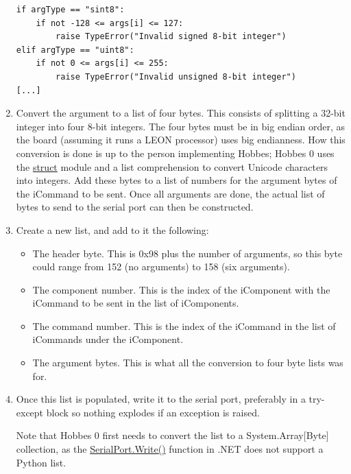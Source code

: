 \documentclass[12pt,letterpaper]{article}
\begin{document}
\begin{enumerate}
\selectfont

\begin{lstlisting}
if argType == "sint8":
    if not -128 <= args[i] <= 127:
        raise TypeError("Invalid signed 8-bit integer")
elif argType == "uint8":
    if not 0 <= args[i] <= 255:
        raise TypeError("Invalid unsigned 8-bit integer")
[...]
\end{lstlisting}

\selectfont

\item Convert the argument to a list of four bytes. This consists of splitting a 32-bit integer into four 8-bit integers. The four bytes must be in big endian order, as the board (assuming it runs a LEON processor) uses big endianness. How this conversion is done is up to the person implementing Hobbes; Hobbes 0 uses the \href{http://docs.python.org/library/struct.html}{struct} module and a list comprehension to convert Unicode characters into integers. Add these bytes to a list of numbers for the argument bytes of the iCommand to be sent. Once all arguments are done, the actual list of bytes to send to the serial port can then be constructed.

\item Create a new list, and add to it the following:

\begin{itemize}

\item The header byte. This is 0x98 plus the number of arguments, so this byte could range from 152 (no arguments) to 158 (six arguments).

\item The component number. This is the index of the iComponent with the iCommand to be sent in the list of iComponents.

\item The command number. This is the index of the iCommand in the list of iCommands under the iComponent.

\item The argument bytes. This is what all the conversion to four byte lists was for.

\end{itemize}

\item Once this list is populated, write it to the serial port, preferably in a try-except block so nothing explodes if an exception is raised.

Note that Hobbes 0 first needs to convert the list to a System.Array[Byte] collection, as the \href{http://msdn.microsoft.com/en-us/library/system.io.ports.serialport.write.aspx}{SerialPort.Write()} function in .NET does not support a Python list.

\end{enumerate}
\end{document}
